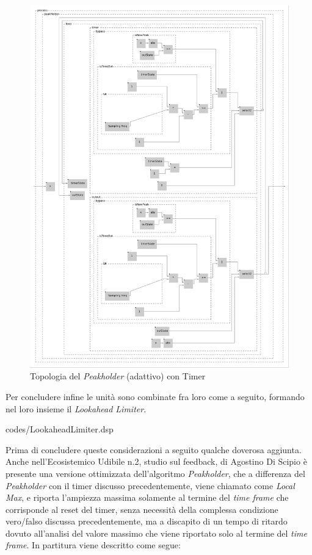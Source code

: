 \begin{figure}[h!]
    \begin{center}
        \includegraphics[width=15cm]{figures/PeakHolderAdaptive.pdf}
        \caption{Topologia del \textit{Peakholder} (adattivo) con Timer}
    \end{center}
    \vspace{0.5cm}
    \end{figure}

\clearpage 

Per concludere infine le unità sono combinate fra loro come a seguito,
formando nel loro insieme il \textit{Lookahead Limiter}.

\vspace{0.5cm} 

{codes/LookaheadLimiter.dsp}

Prima di concludere queste considerazioni a seguito qualche doverosa aggiunta.
Anche nell'Ecosistemico Udibile n.2, studio sul feedback, di Agostino Di Scipio è presente 
una versione ottimizzata dell'algoritmo \textit{Peakholder}, che a differenza
del \textit{Peakholder} con il timer discusso precedentemente, viene chiamato come
\textit{Local Max}, e riporta l'ampiezza massima solamente al termine del \textit{time frame} che corrisponde
al reset del timer, senza necessità della complessa condizione vero/falso discussa precedentemente, 
ma a discapito di un tempo di ritardo dovuto all'analisi del valore massimo che viene riportato 
solo al termine del \textit{time frame}.
In partitura viene descritto come segue:

